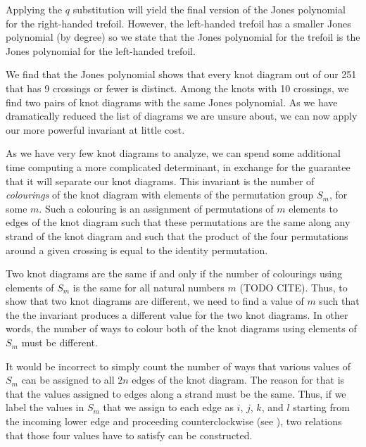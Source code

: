 \begin{paper}
Applying the $q$ substitution will yield the final version of the Jones
polynomial for the right-handed trefoil.
However, the left-handed trefoil has a smaller Jones polynomial (by degree) so
we state that the Jones polynomial for the trefoil is the Jones polynomial for
the left-handed trefoil.



We find that the Jones polynomial shows that every knot diagram out of our 251
that has 9 crossings or fewer is distinct.
Among the knots with 10 crossings, we find two pairs of knot diagrams with the
same Jones polynomial.
As we have dramatically reduced the list of diagrams we are unsure about, we can
now apply our more powerful invariant at little cost.


As we have very few knot diagrams to analyze, we can spend some additional time
computing a more complicated determinant, in exchange for the guarantee that it
will separate our knot diagrams.
This invariant is the number of \textit{colourings} of the knot diagram with
elements of the permutation group $S_m$, for some $m$.
Such a colouring is an assignment of permutations of $m$ elements to edges of
the knot diagram such that these permutations are the same along any strand of
the knot diagram and such that the product of the four permutations around a
given crossing is equal to the identity permutation.

Two knot diagrams are the same if and only if the number of colourings using
elements of $S_m$ is the same for all natural numbers $m$ (TODO CITE).
Thus, to show that two knot diagrams are different, we need to find a value of
$m$ such that the the invariant produces a different value for the two knot
diagrams.
In other words, the number of ways to colour both of the knot diagrams using
elements of $S_m$ must be different.

It would be incorrect to simply count the number of ways that various values of
$S_m$ can be assigned to all $2n$ edges of the knot diagram.
The reason for that is that the values assigned to edges along a strand must be
the same.
Thus, if we label the values in $S_m$ that we assign to each edge as $i$, $j$,
$k$, and $l$ starting from the incoming lower edge and proceeding
counterclockwise (see \figX), two relations that those four values have to
satisfy can be constructed.


\end{paper}
